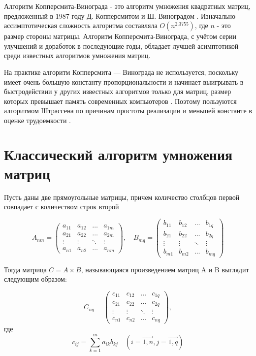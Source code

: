 \documentclass[a4paper,oneside,14pt]{extreport}
\begin{document}
Алгоритм Копперсмита-Винограда - это алгоритм умножения квадратных матриц, предложенный в 1987 году Д. Копперсмитом и Ш. Виноградом \cite{CoppersmithAndWinograd}. Изначально ассимптотическая сложность алгоритма составляла $O(n^{2.3755})$, где $n$ - это размер стороны матрицы. Алгоритм Копперсмита-Винограда, с учётом серии улучшений и доработок в последующие годы, обладает лучшей асимптотикой среди известных алгоритмов умножения матриц.

На практике алгоритм Копперсмита — Винограда не используется, поскольку имеет очень большую константу пропорциональности и начинает выигрывать в быстродействии у других известных алгоритмов только для матриц, размер которых превышает память современных компьютеров \cite{RobinsonSara}.
Поэтому пользуются алгоритмом Штрассена по причинам простоты реализации и меньшей константе в оценке трудоемкости \cite{Strassen}.

\section{Классический алгоритм умножения матриц}
Пусть даны две прямоугольные матрицы, причем количество столбцов первой совпадает с количеством строк второй

\begin{equation}
	A_{nm} = \begin{pmatrix}
		a_{11} & a_{12} & \ldots & a_{1m}\\
		a_{21} & a_{22} & \ldots & a_{2m}\\
		\vdots & \vdots & \ddots & \vdots\\
		a_{n1} & a_{n2} & \ldots & a_{nm}
	\end{pmatrix},
	\quad
	B_{mq} = \begin{pmatrix}
		b_{11} & b_{12} & \ldots & b_{1q}\\
		b_{21} & b_{22} & \ldots & b_{2q}\\
		\vdots & \vdots & \ddots & \vdots\\
		b_{m1} & b_{m2} & \ldots & b_{mq}
	\end{pmatrix}
\end{equation}

Тогда матрица $C = A \times B$, называющаяся произведением матриц A и B выглядит следующим образом:

\begin{equation} 
	C_{nq} = \begin{pmatrix}
		c_{11} & c_{12} & \ldots & c_{1q}\\
		c_{21} & c_{22} & \ldots & c_{2q}\\
		\vdots & \vdots & \ddots & \vdots\\
		c_{n1} & c_{n2} & \ldots & c_{nq}
	\end{pmatrix}, 
\end{equation}
где
\begin{equation} \label{eq:classic_multiply}
c_{ij} = \sum_{k=1}^{m}a_{ik}b_{kj}\quad(i=\vec{1, n}, j=\vec{1,q})
\end{equation}
\end{document}
